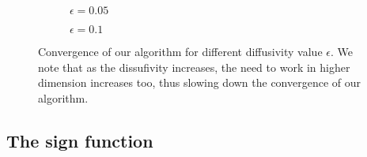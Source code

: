 \documentclass[11pt]{article}
\numberwithin{equation}{section}
\begin{document}
\begin{figure}
    \begin{subfigure}[b]{.45\linewidth}
        
        \caption{$\epsilon = 0.05$}
        \label{fig:ode_0.05}
    \end{subfigure}\hspace{.05\linewidth}
    \begin{subfigure}[b]{.45\linewidth}
        
        \caption{$\epsilon = 0.1$}
        \label{fig:ode_0.1}
    \end{subfigure}
    \caption{Convergence of our algorithm for different diffusivity value $\epsilon$. We note that as the dissufivity increases, the need to work in higher dimension increases too, thus slowing down the convergence of our algorithm. }
    \label{fig:ode_eps}
\end{figure}

\subsection{The sign function}\label{sec:sign}
\end{document}
